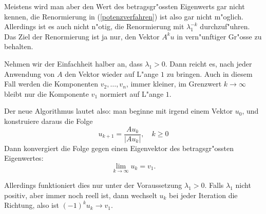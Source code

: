 Meistens wird man aber den Wert des betragsgr"ossten Eigenwerts
gar nicht kennen, die Renormierung in (\ref{potenzverfahren}) 
ist also gar nicht m"oglich.
Allerdings ist es auch nicht n"otig, die Renormierung mit $\lambda_1^{-k}$
durchzuf"uhren.
Das Ziel
der Renormierung ist ja nur, den Vektor $A^ku$ in vern"unftiger
Gr"osse zu behalten.

Nehmen wir der Einfachheit halber an, dass $\lambda_1 > 0$.
Dann reicht es, nach jeder Anwendung von $A$ 
den Vektor wieder auf L"ange $1$ zu bringen.
Auch in diesem Fall werden die Komponenten $v_2,\dots,v_n$, 
immer kleiner, im Grenzwert $k\to\infty$ bleibt nur die Komponente
$v_1$ normiert auf L"ange $1$.

Der neue Algorithmus lautet also: man beginne mit irgend einem Vektor
$u_0$, und konstruiere daraus die Folge
\begin{equation}
u_{k+1}=\frac{Au_k}{|Au_k|}, \quad k\ge 0
\label{potenz-iteration}
\end{equation}
Dann konvergiert die Folge gegen einen Eigenvektor des betragsgr"ossten
Eigenwertes:
\[
\lim_{k\to\infty} u_k=v_1.
\]

Allerdings funktioniert dies nur unter der Voraussetzung $\lambda_1 > 0$.
Falls $\lambda_1$ nicht positiv, aber immer noch reell ist, dann
wechselt $u_k$ bei jeder Iteration die Richtung, also ist $(-1)^ku_k\to v_1$.

